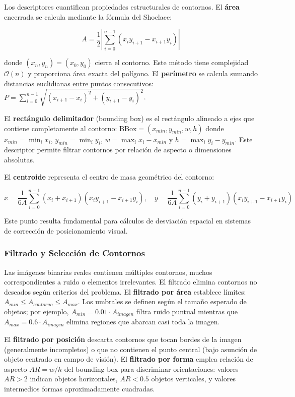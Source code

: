 Los descriptores cuantifican propiedades estructurales de contornos. El \textbf{área} encerrada se calcula mediante la fórmula del Shoelace:

\begin{equation}
A = \frac{1}{2}\left|\sum_{i=0}^{n-1}(x_i y_{i+1} - x_{i+1}y_i)\right|
\end{equation}

donde $(x_n, y_n) = (x_0, y_0)$ cierra el contorno. Este método tiene complejidad $\mathcal{O}(n)$ y proporciona área exacta del polígono. El \textbf{perímetro} se calcula sumando distancias euclidianas entre puntos consecutivos: $P = \sum_{i=0}^{n-1}\sqrt{(x_{i+1}-x_i)^2 + (y_{i+1}-y_i)^2}$.

El \textbf{rectángulo delimitador} (bounding box) es el rectángulo alineado a ejes que contiene completamente al contorno: $\text{BBox} = (x_{min}, y_{min}, w, h)$ donde $x_{min} = \min_i x_i$, $y_{min} = \min_i y_i$, $w = \max_i x_i - x_{min}$ y $h = \max_i y_i - y_{min}$. Este descriptor permite filtrar contornos por relación de aspecto o dimensiones absolutas.

El \textbf{centroide} representa el centro de masa geométrico del contorno:

\begin{equation}
\bar{x} = \frac{1}{6A}\sum_{i=0}^{n-1}(x_i + x_{i+1})(x_i y_{i+1} - x_{i+1}y_i), \quad \bar{y} = \frac{1}{6A}\sum_{i=0}^{n-1}(y_i + y_{i+1})(x_i y_{i+1} - x_{i+1}y_i)
\end{equation}

Este punto resulta fundamental para cálculos de desviación espacial en sistemas de corrección de posicionamiento visual.

\subsubsection{Filtrado y Selección de Contornos}

Las imágenes binarias reales contienen múltiples contornos, muchos correspondientes a ruido o elementos irrelevantes. El filtrado elimina contornos no deseados según criterios del problema. El \textbf{filtrado por área} establece límites: $A_{min} \leq A_{contorno} \leq A_{max}$. Los umbrales se definen según el tamaño esperado de objetos; por ejemplo, $A_{min} = 0.01 \cdot A_{imagen}$ filtra ruido puntual mientras que $A_{max} = 0.6 \cdot A_{imagen}$ elimina regiones que abarcan casi toda la imagen.

El \textbf{filtrado por posición} descarta contornos que tocan bordes de la imagen (generalmente incompletos) o que no contienen el punto central (bajo asunción de objeto centrado en campo de visión). El \textbf{filtrado por forma} emplea relación de aspecto $AR = w/h$ del bounding box para discriminar orientaciones: valores $AR > 2$ indican objetos horizontales, $AR < 0.5$ objetos verticales, y valores intermedios formas aproximadamente cuadradas.

